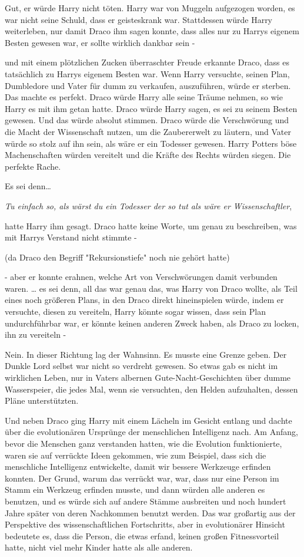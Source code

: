 {Gut, er würde Harry nicht töten. Harry war von Muggeln aufgezogen worden, es war nicht seine Schuld, dass er geisteskrank war. Stattdessen würde Harry weiterleben, nur damit Draco ihm sagen konnte, dass alles nur zu Harrys eigenem Besten gewesen war, er sollte wirklich dankbar sein -

und mit einem plötzlichen Zucken überraschter Freude erkannte Draco, dass es tatsächlich zu Harrys eigenem Besten war. Wenn Harry versuchte, seinen Plan, Dumbledore und Vater für dumm zu verkaufen, auszuführen, würde er sterben. Das machte es perfekt. Draco würde Harry alle seine Träume nehmen, so wie Harry es mit ihm getan hatte. Draco würde Harry sagen, es sei zu seinem Besten gewesen. Und das würde absolut stimmen. Draco würde die Verschwörung und die Macht der Wissenschaft nutzen, um die Zaubererwelt zu läutern, und Vater würde so stolz auf ihn sein, als wäre er ein Todesser gewesen. Harry Potters böse Machenschaften würden vereitelt und die Kräfte des Rechts würden siegen. Die perfekte Rache.

Es sei denn…

\emph{Tu einfach so, als wärst du ein Todesser der so tut als wäre er Wissenschaftler},

hatte Harry ihm gesagt. Draco hatte keine Worte, um genau zu beschreiben, was mit Harrys Verstand nicht stimmte -

(da Draco den Begriff "Rekursionstiefe" noch nie gehört hatte)

- aber er konnte erahnen, welche Art von Verschwörungen damit verbunden waren. … es sei denn, all das war genau das, was Harry von Draco wollte, als Teil eines noch größeren Plans, in den Draco direkt hineinspielen würde, indem er versuchte, diesen zu vereiteln, Harry könnte sogar wissen, dass sein Plan undurchführbar war, er könnte keinen anderen Zweck haben, als Draco zu locken, ihn zu vereiteln -

Nein. In dieser Richtung lag der Wahnsinn. Es musste eine Grenze geben. Der Dunkle Lord selbst war nicht so verdreht gewesen. So etwas gab es nicht im wirklichen Leben, nur in Vaters albernen Gute-Nacht-Geschichten über dumme Wasserspeier, die jedes Mal, wenn sie versuchten, den Helden aufzuhalten, dessen Pläne unterstützten.

Und neben Draco ging Harry mit einem Lächeln im Gesicht entlang und dachte über die evolutionären Ursprünge der menschlichen Intelligenz nach. Am Anfang, bevor die Menschen ganz verstanden hatten, wie die Evolution funktionierte, waren sie auf verrückte Ideen gekommen, wie zum Beispiel, dass sich die menschliche Intelligenz entwickelte, damit wir bessere Werkzeuge erfinden konnten. Der Grund, warum das verrückt war, war, dass nur eine Person im Stamm ein Werkzeug erfinden musste, und dann würden alle anderen es benutzen, und es würde sich auf andere Stämme ausbreiten und noch hundert Jahre später von deren Nachkommen benutzt werden. Das war großartig aus der Perspektive des wissenschaftlichen Fortschritts, aber in evolutionärer Hinsicht bedeutete es, dass die Person, die etwas erfand, keinen großen Fitnessvorteil hatte, nicht viel mehr Kinder hatte als alle anderen.

}
